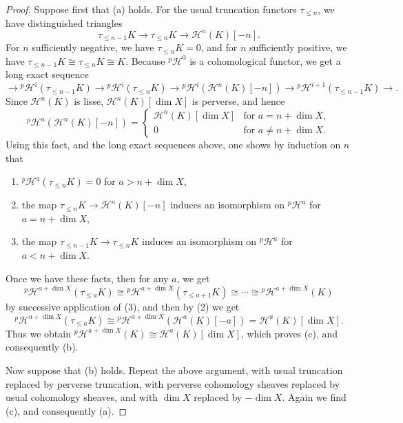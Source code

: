 \begin{proof}
Suppose first that (a) holds. For the usual truncation functors
\(\tau_{\leq n}\), we have distinguished triangles
\[
  \tau_{\leq n-1}K\to\tau_{\leq n}K\to\mathcal{H}^n(K)[-n].
\]
For \(n\) sufficiently negative, we have \(\tau_{\leq n}K=0\), and for
\(n\) sufficiently positive, we have
\(\tau_{\leq n-1}K\cong\tau_{\leq n}K\cong K\). Because
\({}^p\mathcal{H}^0\) is a cohomological functor, we get a long exact
sequence
\[
  \to{}^p\mathcal{H}^i(\tau_{\leq n-1}K)
  \to{}^p\mathcal{H}^i(\tau_{\leq n}K)
  \to{}^p\mathcal{H}^i(\mathcal{H}^n(K)[-n])
  \to{}^p\mathcal{H}^{i+1}(\tau_{\leq n-1}K)\to .
\]
Since \(\mathcal{H}^n(K)\) is lisse,
\(\mathcal{H}^n(K)[\dim X]\) is perverse, and hence
\[
  {}^p\mathcal{H}^a(\mathcal{H}^n(K)[-n])
  =
  \begin{cases}
    \mathcal{H}^n(K)[\dim X] & \text{for } a=n+\dim X,\\
    0 & \text{for } a\neq n+\dim X.
  \end{cases}
\]
Using this fact, and the long exact sequences above, one shows by induction on
\(n\) that
\begin{enumerate}[label=(\arabic*)]
\item \({}^p\mathcal{H}^a(\tau_{\leq n}K)=0\) for \(a>n+\dim X\),
\item the map
\(\tau_{\leq n}K\to\mathcal{H}^n(K)[-n]\) induces an isomorphism on
\({}^p\mathcal{H}^a\) for \(a=n+\dim X\),
\item the map \(\tau_{\leq n-1}K\to\tau_{\leq n}K\) induces an isomorphism on
\({}^p\mathcal{H}^a\) for \(a<n+\dim X\).
\end{enumerate}
Once we have these facts, then for any \(a\), we get
\[
  {}^p\mathcal{H}^{a+\dim X}(\tau_{\leq a}K)
  \cong{}^p\mathcal{H}^{a+\dim X}(\tau_{\leq a+1}K)
  \cong\cdots\cong{}^p\mathcal{H}^{a+\dim X}(K)
\]
by successive application of (3), and then by (2) we get
\[
  {}^p\mathcal{H}^{a+\dim X}(\tau_{\leq a}K)
  \cong
  {}^p\mathcal{H}^{a+\dim X}(\mathcal{H}^a(K)[-a])
  =\mathcal{H}^a(K)[\dim X].
\]
Thus we obtain
\({}^p\mathcal{H}^{a+\dim X}(K)\cong\mathcal{H}^a(K)[\dim X]\), which proves
(c), and consequently (b).

Now suppose that (b) holds. Repeat the above argument, with usual truncation
replaced by perverse truncation, with perverse cohomology sheaves replaced by
usual cohomology sheaves, and with \(\dim X\) replaced by \(-\dim X\). Again
we find (c), and consequently (a).
\end{proof}

